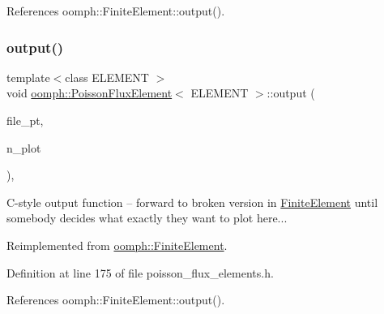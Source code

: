 References oomph\+::\+Finite\+Element\+::output().

\mbox{\label{classoomph_1_1PoissonFluxElement_acef72a7460036c88ba254d58e26bc820}} 
\subsubsection{\texorpdfstring{output()}{output()}\hspace{0.1cm}{\footnotesize\ttfamily [4/4]}}
{\footnotesize\ttfamily template$<$class E\+L\+E\+M\+E\+NT $>$ \\
void \hyperlink{classoomph_1_1PoissonFluxElement}{oomph\+::\+Poisson\+Flux\+Element}$<$ E\+L\+E\+M\+E\+NT $>$\+::output (\begin{DoxyParamCaption}\item[{F\+I\+LE $\ast$}]{file\+\_\+pt,  }\item[{const unsigned \&}]{n\+\_\+plot }\end{DoxyParamCaption})\hspace{0.3cm}{\ttfamily [inline]}, {\ttfamily [virtual]}}



C-\/style output function -- forward to broken version in \hyperlink{classoomph_1_1FiniteElement}{Finite\+Element} until somebody decides what exactly they want to plot here... 



Reimplemented from \hyperlink{classoomph_1_1FiniteElement_adfaee690bb0608f03320eeb9d110d48c}{oomph\+::\+Finite\+Element}.



Definition at line 175 of file poisson\+\_\+flux\+\_\+elements.\+h.



References oomph\+::\+Finite\+Element\+::output().

\mbox{\label{classoomph_1_1PoissonFluxElement_a027e2abd393a9e53d0da0374eb556aab}} 
